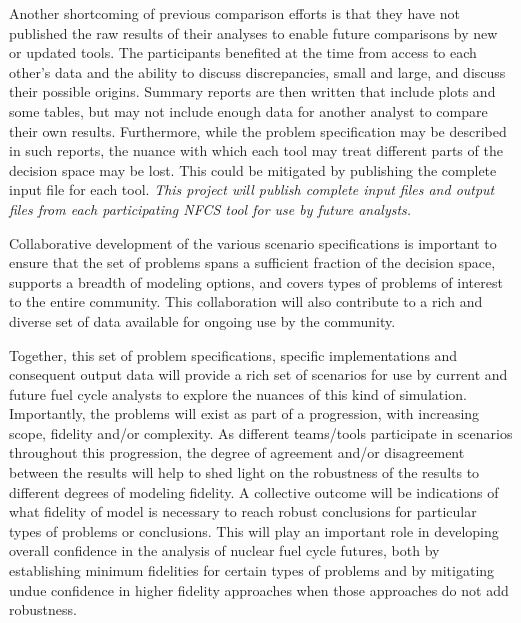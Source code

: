 Another shortcoming of previous comparison efforts is that they have not
published the raw results of their analyses to enable future comparisons by
new or updated tools.  The participants benefited at the time from access to
each other's data and the ability to discuss discrepancies, small and large,
and discuss their possible origins.  Summary reports are then written that
include plots and some tables, but may not include enough data for another
analyst to compare their own results.  Furthermore, while the problem
specification may be described in such reports, the nuance with which each
tool may treat different parts of the decision space may be lost.  This could
be mitigated by publishing the complete input file for each tool.  \emph{This
  project will publish complete input files and output files from each
  participating \gls{NFCS} tool for use by future analysts.}

Collaborative development of the various scenario specifications is important
to ensure that the set of problems spans a sufficient fraction of the decision
space, supports a breadth of modeling options, and covers types of problems of
interest to the entire community.  This collaboration will also contribute to
a rich and diverse set of data available for ongoing use by the community.

Together, this set of problem specifications, specific implementations and
consequent output data will provide a rich set of scenarios for use by current
and future fuel cycle analysts to explore the nuances of this kind of
simulation.  Importantly, the problems will exist as part of a progression,
with increasing scope, fidelity and/or complexity.  As different teams/tools
participate in scenarios throughout this progression, the degree of agreement
and/or disagreement between the results will help to shed light on the
robustness of the results to different degrees of modeling fidelity.  A
collective outcome will be indications of what fidelity of model is necessary
to reach robust conclusions for particular types of problems or conclusions.
This will play an important role in developing overall confidence in the
analysis of nuclear fuel cycle futures, both by establishing minimum
fidelities for certain types of problems and by mitigating undue confidence in
higher fidelity approaches when those approaches do not add robustness.

